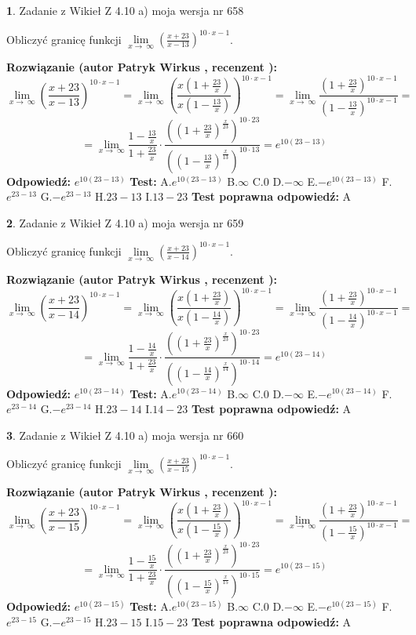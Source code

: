 \documentclass[12pt, a4paper]{article}
\theoremstyle{definition} %
\newtheorem{zad}{}
\newcommand{\zadStart}[1]{\begin{zad}#1\newline}
\newcommand{\zadStop}{\end{zad}}
\newcommand{\rozwStart}[2]{\noindent \textbf{Rozwiązanie (autor #1 , recenzent #2): }\newline}
\newcommand{\rozwStop}{\newline}
\newcommand{\odpStart}{\noindent \textbf{Odpowiedź:}\newline}
\newcommand{\odpStop}{\newline}
\newcommand{\testStart}{\noindent \textbf{Test:}\newline}
\newcommand{\testStop}{\newline}
\newcommand{\kluczStart}{\noindent \textbf{Test poprawna odpowiedź:}\newline}
\newcommand{\kluczStop}{\newline}
\begin{document}
\zadStart{Zadanie z Wikieł Z 4.10 a) moja wersja nr 658}


Obliczyć granicę funkcji  $\lim\limits_{x\to\ \infty}(\frac{x+23}{x-13})^{10\cdot x-1}$.
\zadStop
\rozwStart{Patryk Wirkus}{}
$$\lim\limits_{x\to\ \infty}(\frac{x+23}{x-13})^{10\cdot x-1} = \lim\limits_{x\to\ \infty}(\frac{x(1+\frac{23}{x})}{x(1-\frac{13}{x})})^{10\cdot x-1}=\lim\limits_{x\to\ \infty}\frac{(1+\frac{23}{x})^{10\cdot x-1}}{(1-\frac{13}{x})^{10\cdot x-1}}=$$
$$=\lim\limits_{x\to\ \infty}\frac{1-\frac{13}{x}}{1+\frac{23}{x}}\cdot\frac{((1+\frac{23}{x})^{\frac{x}{23}})^{10\cdot23}}{((1-\frac{13}{x})^{\frac{x}{13}})^{10\cdot13}}=e^{10(23-13)}$$
\rozwStop
\odpStart
$e^{10(23-13)}$
\odpStop
\testStart
A.$e^{10(23-13)}$ B.$\infty$ C.$0$ D.$-\infty$ E.$-e^{10(23-13)}$
F.$e^{23-13}$ G.$-e^{23-13}$
H.$23-13$
I.$13-23$
\testStop
\kluczStart
A
\kluczStop



\zadStart{Zadanie z Wikieł Z 4.10 a) moja wersja nr 659}


Obliczyć granicę funkcji  $\lim\limits_{x\to\ \infty}(\frac{x+23}{x-14})^{10\cdot x-1}$.
\zadStop
\rozwStart{Patryk Wirkus}{}
$$\lim\limits_{x\to\ \infty}(\frac{x+23}{x-14})^{10\cdot x-1} = \lim\limits_{x\to\ \infty}(\frac{x(1+\frac{23}{x})}{x(1-\frac{14}{x})})^{10\cdot x-1}=\lim\limits_{x\to\ \infty}\frac{(1+\frac{23}{x})^{10\cdot x-1}}{(1-\frac{14}{x})^{10\cdot x-1}}=$$
$$=\lim\limits_{x\to\ \infty}\frac{1-\frac{14}{x}}{1+\frac{23}{x}}\cdot\frac{((1+\frac{23}{x})^{\frac{x}{23}})^{10\cdot23}}{((1-\frac{14}{x})^{\frac{x}{14}})^{10\cdot14}}=e^{10(23-14)}$$
\rozwStop
\odpStart
$e^{10(23-14)}$
\odpStop
\testStart
A.$e^{10(23-14)}$ B.$\infty$ C.$0$ D.$-\infty$ E.$-e^{10(23-14)}$
F.$e^{23-14}$ G.$-e^{23-14}$
H.$23-14$
I.$14-23$
\testStop
\kluczStart
A
\kluczStop



\zadStart{Zadanie z Wikieł Z 4.10 a) moja wersja nr 660}


Obliczyć granicę funkcji  $\lim\limits_{x\to\ \infty}(\frac{x+23}{x-15})^{10\cdot x-1}$.
\zadStop
\rozwStart{Patryk Wirkus}{}
$$\lim\limits_{x\to\ \infty}(\frac{x+23}{x-15})^{10\cdot x-1} = \lim\limits_{x\to\ \infty}(\frac{x(1+\frac{23}{x})}{x(1-\frac{15}{x})})^{10\cdot x-1}=\lim\limits_{x\to\ \infty}\frac{(1+\frac{23}{x})^{10\cdot x-1}}{(1-\frac{15}{x})^{10\cdot x-1}}=$$
$$=\lim\limits_{x\to\ \infty}\frac{1-\frac{15}{x}}{1+\frac{23}{x}}\cdot\frac{((1+\frac{23}{x})^{\frac{x}{23}})^{10\cdot23}}{((1-\frac{15}{x})^{\frac{x}{15}})^{10\cdot15}}=e^{10(23-15)}$$
\rozwStop
\odpStart
$e^{10(23-15)}$
\odpStop
\testStart
A.$e^{10(23-15)}$ B.$\infty$ C.$0$ D.$-\infty$ E.$-e^{10(23-15)}$
F.$e^{23-15}$ G.$-e^{23-15}$
H.$23-15$
I.$15-23$
\testStop
\kluczStart
A
\kluczStop
\end{document}
